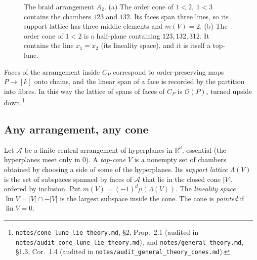 \documentclass[11pt]{article}
\theoremstyle{definition}
\theoremstyle{remark}
\newcommand{\OP}{\mathcal O}
\newcommand{\lin}{\operatorname{lin}}
\newcommand{\src}[1]{\nolinkurl{#1}}
\newcommand{\tagbox}[1]{\leavevmode\marginpar{\raggedright\fbox{\parbox{0.66in}{\centering\scriptsize\sffamily #1}}}}
\newcommand{\PROVEN}{\tagbox{PROVEN\\AUDITED}}
\begin{document}
\begin{figure}[ht]
\centering
{}
\caption{The braid arrangement $A_2$. (a) The order cone of $1<2,\ 1<3$
contains the chambers $123$ and $132$. Its faces span three lines, so its
support lattice has three middle elements and $m(V)=2$. (b) The order cone of
$1<2$ is a half-plane containing $123,132,312$. It contains the line
$x_1=x_2$ (its lineality space), and it is itself a top-lune.}\label{fig:A2}
\end{figure}

Faces of the arrangement inside $C_P$ correspond to order-preserving maps
$P\to[k]$ onto chains, and the linear span of a face is recorded by the
partition into fibres. In this way the lattice of spans of faces of $C_P$ is
$\OP(P)$, turned upside down.\footnote{\src{notes/cone_lune_lie_theory.md},
\S2, Prop.~2.1 (audited in \src{notes/audit_cone_lune_lie_theory.md}), and
\src{notes/general_theory.md}, \S1.3, Cor.~1.4 (audited in
\src{notes/audit_general_theory_cones.md}).}\PROVEN

\subsection{Any arrangement, any cone}

Let $\mathcal A$ be a finite central arrangement of hyperplanes in
$\mathbb R^d$, essential (the hyperplanes meet only in $0$). A
\emph{top-cone} $V$ is a nonempty set of chambers obtained by choosing a side
of some of the hyperplanes. Its \emph{support lattice} $\Lambda(V)$ is the set
of subspaces spanned by faces of $\mathcal A$ that lie in the closed cone
$|V|$, ordered by inclusion. Put $m(V)=(-1)^d\mu(\Lambda(V))$. The
\emph{lineality space} $\lin V=|V|\cap-|V|$ is the largest subspace inside the
cone. The cone is \emph{pointed} if $\lin V=0$.
\end{document}
